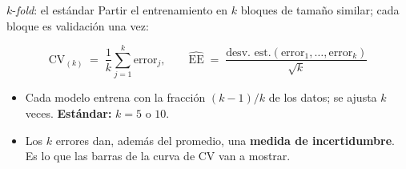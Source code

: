 \documentclass{beamer}
\newcommand{\1}{\mathbb{I}}
\begin{document}
\begin{frame}{$k$-\emph{fold}: el estándar}
\small
Partir el entrenamiento en $k$ bloques de tamaño similar; cada bloque es validación una vez:
\begin{center}
\end{center}
\pause
\[ \mathrm{CV}_{(k)} \;=\; \frac{1}{k}\sum_{j=1}^{k} \text{error}_j, \qquad \widehat{\mathrm{EE}} \;=\; \frac{\text{desv.\ est.}(\text{error}_1, \ldots, \text{error}_k)}{\sqrt{k}} \]
\begin{itemize}\itemsep3pt
  \item Cada modelo entrena con la fracción $(k-1)/k$ de los datos; se ajusta $k$ veces. \textbf{Estándar:} $k = 5$ o $10$.
  \item Los $k$ errores dan, además del promedio, una \textbf{medida de incertidumbre}. Es lo que las barras de la curva de CV van a mostrar.
\end{itemize}
\end{frame}
\end{document}
